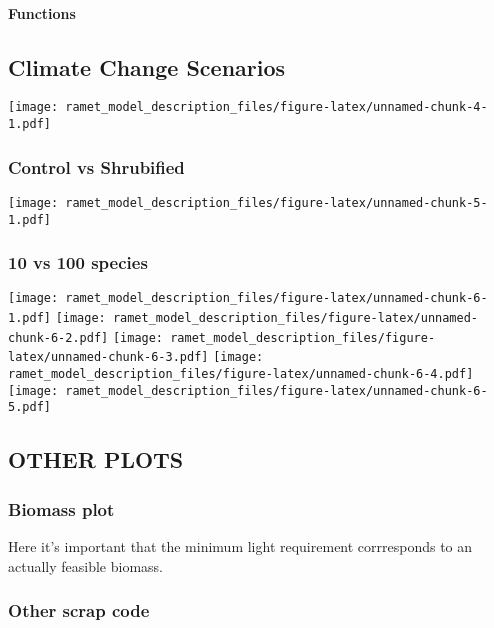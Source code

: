 \documentclass[
]{article}
\begin{document}
\paragraph{Functions}\label{functions}

\subsection{Climate Change Scenarios}\label{climate-change-scenarios}

\texttt{[image: ramet\_model\_description\_files/figure-latex/unnamed-chunk-4-1.pdf]}

\subsubsection{Control vs Shrubified}\label{control-vs-shrubified}

\texttt{[image: ramet\_model\_description\_files/figure-latex/unnamed-chunk-5-1.pdf]}

\subsubsection{10 vs 100 species}\label{vs-100-species}

\texttt{[image: ramet\_model\_description\_files/figure-latex/unnamed-chunk-6-1.pdf]}
\texttt{[image: ramet\_model\_description\_files/figure-latex/unnamed-chunk-6-2.pdf]}
\texttt{[image: ramet\_model\_description\_files/figure-latex/unnamed-chunk-6-3.pdf]}
\texttt{[image: ramet\_model\_description\_files/figure-latex/unnamed-chunk-6-4.pdf]}
\texttt{[image: ramet\_model\_description\_files/figure-latex/unnamed-chunk-6-5.pdf]}

\subsection{OTHER PLOTS}\label{other-plots}

\subsubsection{Biomass plot}\label{biomass-plot}

Here it's important that the minimum light requirement corrresponds to
an actually feasible biomass.

\subsubsection{Other scrap code}\label{other-scrap-code}
\end{document}
